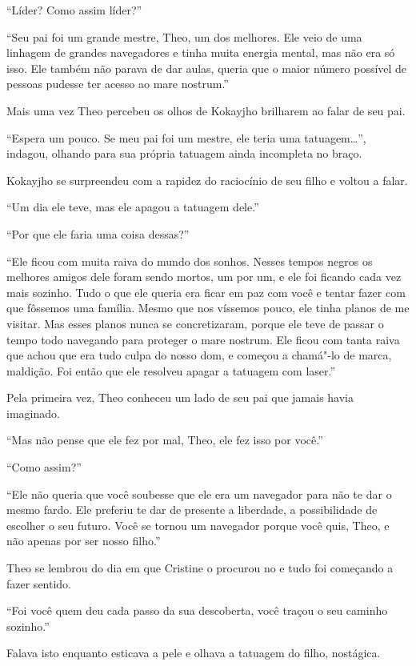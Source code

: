 ``Líder? Como assim líder?''

``Seu pai foi um grande mestre, Theo, um dos melhores. Ele veio de uma
linhagem de grandes navegadores e tinha muita energia mental, mas não
era só isso. Ele também não parava de dar aulas, queria que o maior
número possível de pessoas pudesse ter acesso ao mare nostrum.''

Mais uma vez Theo percebeu os olhos de Kokayjho brilharem ao falar de
seu pai.

``Espera um pouco. Se meu pai foi um mestre, ele teria uma tatuagem\ldots{}'',
indagou, olhando para sua própria tatuagem ainda incompleta no braço.

Kokayjho se surpreendeu com a rapidez do raciocínio de seu filho e
voltou a falar.

``Um dia ele teve, mas ele apagou a tatuagem dele.''

``Por que ele faria uma coisa dessas?''

``Ele ficou com muita raiva do mundo dos sonhos. Nesses tempos negros os
melhores amigos dele foram sendo mortos, um por um, e ele foi ficando
cada vez mais sozinho. Tudo o que ele queria era ficar em paz com você e
tentar fazer com que fôssemos uma família. Mesmo que nos víssemos pouco,
ele tinha planos de me visitar. Mas esses planos nunca se concretizaram,
porque ele teve de passar o tempo todo navegando para proteger o
mare nostrum. Ele ficou com tanta raiva que achou que era tudo culpa do
nosso dom, e começou a chamá"-lo de marca, maldição. Foi então que ele
resolveu apagar a tatuagem com laser.''

Pela primeira vez, Theo conheceu um lado de seu pai que jamais havia
imaginado.

``Mas não pense que ele fez por mal, Theo, ele fez isso por você.''

``Como assim?''

``Ele não queria que você soubesse que ele era um navegador para não te
dar o mesmo fardo. Ele preferiu te dar de presente a liberdade, a
possibilidade de escolher o seu futuro. Você se tornou um navegador
porque você quis, Theo, e não apenas por ser nosso filho.''

Theo se lembrou do dia em que Cristine o procurou no  e tudo foi
começando a fazer sentido.

``Foi você quem deu cada passo da sua descoberta, você traçou o seu
caminho sozinho.''

Falava isto enquanto esticava a pele e olhava a tatuagem do filho,
nostágica.

